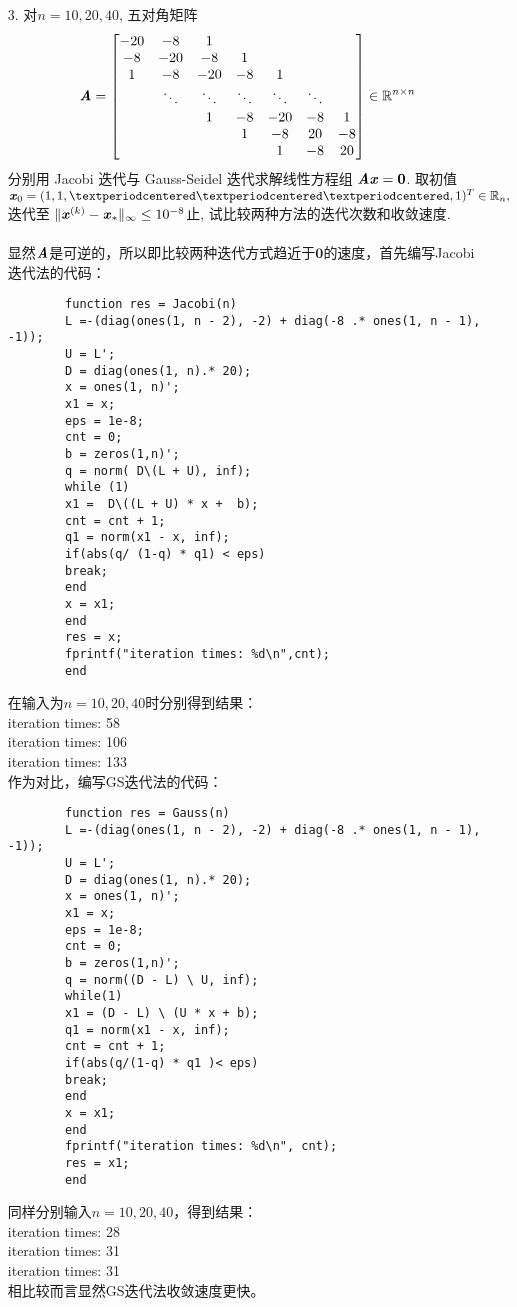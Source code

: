 \documentclass{article}
\newcommand{\xc}[1]{\textbf{\emph{#1}}}
\begin{document}
\begin{itemize}
		\item[3.]对$n = 10, 20, 40$, 五对角矩阵
		$$
			\xc{A} = \begin{bmatrix}
			-20 & -8 & 1 & \quad & \quad & \quad & \quad \\
			-8 & -20 & -8 & 1 & \quad & \quad & \quad \\
			1 &-8 & -20 & -8 & 1 & \quad & \quad \\
			\quad & \ddots &  \ddots &  \ddots &  \ddots & \ddots &\quad \\
			 \quad & \quad &1 &-8 & -20 & -8 & 1\\
			 \quad & \quad & \quad & 1 & -8 & 20 & -8\\
			 \quad & \quad & \quad & \quad & 1 & -8 & 20\\
			\end{bmatrix} \in \mathbb{R}^{n\times n}
		$$
		分别用 Jacobi 迭代与 Gauss-Seidel 迭代求解线性方程组 $\xc{Ax} = \textbf{0}$. 取初值 $\xc{x}_0 =(1, 1, · · · , 1)^T \in \mathbb{R}_n,$ 迭代至 $\|\xc{x}^{(k)} - \xc{x}_*\|_{\infty}\le10^{-8}$止, 试比较两种方法的迭代次数和收敛速度.\\
		\\
		显然$\xc{A}$是可逆的，所以即比较两种迭代方式趋近于$\textbf{0}$的速度，首先编写Jacobi迭代法的代码：
		\begin{lstlisting}
		function res = Jacobi(n)
		L =-(diag(ones(1, n - 2), -2) + diag(-8 .* ones(1, n - 1), -1));
		U = L';
		D = diag(ones(1, n).* 20);
		x = ones(1, n)';
		x1 = x;
		eps = 1e-8;
		cnt = 0;
		b = zeros(1,n)';
		q = norm( D\(L + U), inf);
		while (1)
		x1 =  D\((L + U) * x +  b);
		cnt = cnt + 1;
		q1 = norm(x1 - x, inf);
		if(abs(q/ (1-q) * q1) < eps) 
		break;
		end
		x = x1;
		end
		res = x;
		fprintf("iteration times: %d\n",cnt);
		end
		\end{lstlisting}
		在输入为$n = 10, 20, 40$时分别得到结果：\\
		iteration times: 58 \\
		iteration times: 106 \\
		iteration times: 133\\
		作为对比，编写GS迭代法的代码：
		\begin{lstlisting}
		function res = Gauss(n)
		L =-(diag(ones(1, n - 2), -2) + diag(-8 .* ones(1, n - 1), -1));
		U = L';
		D = diag(ones(1, n).* 20);
		x = ones(1, n)';
		x1 = x;
		eps = 1e-8;
		cnt = 0;
		b = zeros(1,n)';
		q = norm((D - L) \ U, inf);
		while(1)
		x1 = (D - L) \ (U * x + b);
		q1 = norm(x1 - x, inf);
		cnt = cnt + 1;
		if(abs(q/(1-q) * q1 )< eps)
		break;
		end
		x = x1;
		end
		fprintf("iteration times: %d\n", cnt);
		res = x1;
		end
		\end{lstlisting}
		同样分别输入$n = 10, 20, 40$，得到结果：\\
		iteration times: 28\\
		iteration times: 31\\
		iteration times: 31\\
		相比较而言显然GS迭代法收敛速度更快。
	\end{itemize}
\end{document}
